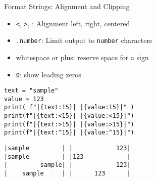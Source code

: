 \begin{frame}[fragile]{Format Strings: Alignment and Clipping}
%
\begin{itemize}
\item \texttt{<}, \texttt{>}, \inPy{^}: Alignment left, right, centered
\item \texttt{.number}: Limit output to \texttt{number} characters
\item whitespace or plus: reserve space for a sign
\item \texttt{0}: show leading zeros
\end{itemize}
%
\begin{codebox}[Code: Format Strings (3), width=.49\linewidth, nobeforeafter, equal height group = grpFormatString3]
\begin{verbatim}
text = "sample"
value = 123
print( f"|{text:15}| |{value:15}|" )
print(f"|{text:<15}| |{value:<15}|")
print(f"|{text:>15}| |{value:>15}|")
print(f"|{text:^15}| |{value:^15}|")
\end{verbatim}
\end{codebox}
%
\begin{cmdbox}[Output: Format Strings (3), width=.49\linewidth, nobeforeafter, equal height group = grpFormatString3]
\begin{verbatim}
|sample         | |            123|
|sample         | |123            |
|         sample| |            123|
|    sample     | |      123      |
\end{verbatim}
\end{cmdbox}
%
\end{frame}


